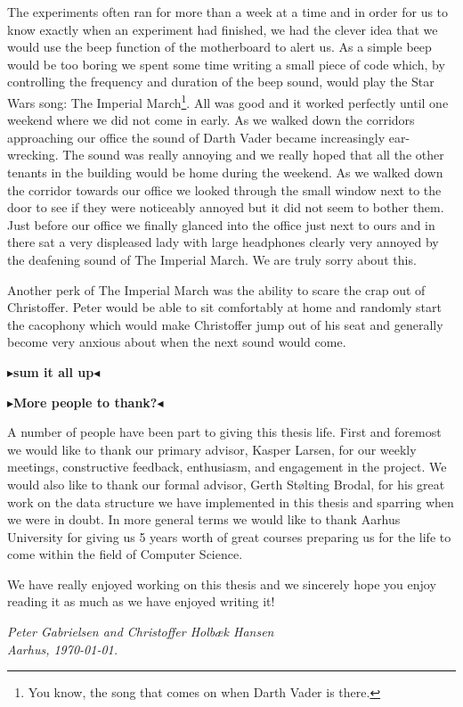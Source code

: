 \documentclass[twoside,11pt,openright]{report}
\newcommand{\todo}[1]{{\color[rgb]{.5,0,0}\textbf{$\blacktriangleright$#1$\blacktriangleleft$}}}
\begin{document}
The experiments often ran for more than a week at a time and in order for us to know exactly when an experiment had finished, we had the clever idea that we would use the beep function of the motherboard to alert us. As a simple beep would be too boring we spent some time writing a small piece of code which, by controlling the frequency and duration of the beep sound, would play the Star Wars song: The Imperial March\footnote{You know, the song that comes on when Darth Vader is there.}. All was good and it worked perfectly until one weekend where we did not come in early. As we walked down the corridors approaching our office the sound of Darth Vader became increasingly ear-wrecking. The sound was really annoying and we really hoped that all the other tenants in the building would be home during the weekend. As we walked down the corridor towards our office we looked through the small window next to the door to see if they were noticeably annoyed but it did not seem to bother them. Just before our office we finally glanced into the office just next to ours and in there sat a very displeased lady with large headphones clearly very annoyed by the deafening sound of The Imperial March. We are truly sorry about this.

Another perk of The Imperial March was the ability to scare the crap out of Christoffer. Peter would be able to sit comfortably at home and randomly start the cacophony which would make Christoffer jump out of his seat and generally become very anxious about when the next sound would come.

\todo{sum it all up}

\todo{More people to thank?}

A number of people have been part to giving this thesis life. First and foremost we would like to thank our primary advisor, Kasper Larsen, for our weekly meetings, constructive feedback, enthusiasm, and engagement in the project.
We would also like to thank our formal advisor, Gerth St\o lting Brodal, for his great work on the data structure we have implemented in this thesis and sparring when we were in doubt.
In more general terms we would like to thank Aarhus University for giving us 5 years worth of great courses preparing us for the life to come within the field of Computer Science.

We have really enjoyed working on this thesis and we sincerely hope you enjoy reading it as much as we have enjoyed writing it!

\vspace{2ex}
\begin{flushright}
  \emph{Peter Gabrielsen and Christoffer Holb\ae k Hansen}\\
  \emph{Aarhus, \today.}
\end{flushright}
\end{document}
